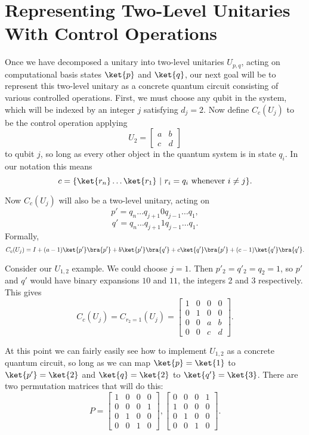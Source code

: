 \section{Representing Two-Level Unitaries With Control Operations}
Once we have decomposed a unitary into two-level unitaries $U_{p,q}$, acting on computational basis states $\ket{p}$ and $\ket{q}$, our next goal will be to represent this two-level unitary as a concrete quantum circuit consisting of various controlled operations. First, we must choose any qubit in the system, which will be indexed by an integer $j$ satisfying $d_j = 2$. Now define $C_c(U_j)$ to be the control operation applying 
\[U_2 = \begin{bmatrix}
a & b \\
c & d
\end{bmatrix}\]
to qubit $j$, so long as every other object in the quantum system is in state $q_i$. In our notation this means
\[c = \{\ket{r_n}\dots\ket{r_1}\ |\ r_i = q_i \text{\ whenever\ } i \neq j\}.\]

Now $C_c(U_j)$ will also be a two-level unitary, acting on
\[p' = q_n \dots q_{j+1} 0 q_{j-1} \dots q_1,\]
\[q' = q_n \dots q_{j+1} 1 q_{j-1} \dots q_1.\]
Formally,
\[C_c(U_j) = I + (a-1)\ket{p'}\bra{p'} + b\ket{p'}\bra{q'}+ c\ket{q'}\bra{p'}+ (c-1)\ket{q'}\bra{q'}.\]

Consider our $U_{1,2}$ example. We could choose $j = 1$. Then $p'_2 = q'_2 = q_2 = 1$, so $p'$ and $q'$ would have binary expansions $10$ and $11$, the integers 2 and 3 respectively. This gives
\[C_c(U_j) = C_{r_2=1}(U_j) = \begin{bmatrix}
	1 & 0 & 0 & 0 \\
	0 & 1 & 0 & 0 \\
	0 & 0 & a & b \\
	0 & 0 & c & d
\end{bmatrix}.
\]

At this point we can fairly easily see how to implement $U_{1,2}$ as a concrete quantum circuit, so long as we can map $\ket{p}=\ket{1}$ to $\ket{p'} = \ket{2}$ and $\ket{q}=\ket{2}$ to $\ket{q'}=\ket{3}$. There are two permutation matrices that will do this:
\[P = \begin{bmatrix}
	1 & 0 & 0 & 0 \\
	0 & 0 & 0 & 1 \\
	0 & 1 & 0 & 0 \\
	0 & 0 & 1 & 0
\end{bmatrix}, \begin{bmatrix}
	0 & 0 & 0 & 1 \\
	1 & 0 & 0 & 0 \\
	0 & 1 & 0 & 0 \\
	0 & 0 & 1 & 0
\end{bmatrix}.\]

